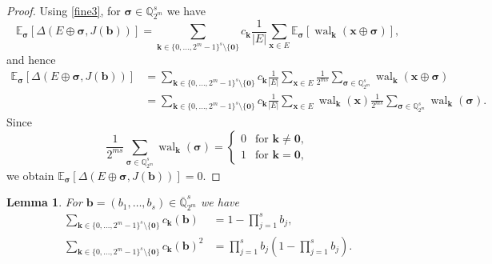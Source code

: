 \documentclass[12pt]{article}
\newtheorem{lemma}[theorem]{Lemma}
\theoremstyle{definition}
\numberwithin{equation}{section}
\begin{document}
\begin{proof}
Using \eqref{fine3}, for $\bm{\sigma} \in \mathbb{Q}_{2^m}^s$ we have
\begin{equation}\label{fo:Delta1}
\mathbb{E}_{\bm{\sigma}} [\Delta(E \oplus \bm{\sigma}, J(\bm{b})) ] = \sum_{\bm{k} \in \{0, \ldots, 2^{m}-1\}^s \setminus \{\bm{0}\}}  c_{\bm{k}} \frac{1}{|E|} \sum_{\bm{x} \in E} \mathbb{E}_{\bm{\sigma}} [ \operatorname{wal}_{\bm{k}}(\bm{x} \oplus \bm{\sigma}) ],
\end{equation}
and hence 
\begin{align*}
\mathbb{E}_{\bm{\sigma}} [\Delta(E \oplus \bm{\sigma}, J(\bm{b})) ] & = \sum_{\bm{k} \in \{0, \ldots, 2^m-1\}^s \setminus \{\bm{0}\}} c_{\bm{k}} \frac{1}{|E|} \sum_{\bm{x} \in E} \frac{1}{2^{ ms}} \sum_{\bm{\sigma} \in \mathbb{Q}_{2^m}^s} \operatorname{wal}_{\bm{k}}(\bm{x} \oplus \bm{\sigma}) \\ & = \sum_{\bm{k} \in \{0, \ldots, 2^m-1\}^s \setminus \{\bm{0}\}} c_{\bm{k}} \frac{1}{|E|} \sum_{\bm{x} \in E} \operatorname{wal}_{\bm{k}}(\bm{x}) \frac{1}{2^{ ms}} \sum_{\bm{\sigma} \in \mathbb{Q}_{2^m}^s} \operatorname{wal}_{\bm{k}}(\bm{\sigma}).
\end{align*}
Since
\begin{equation*}
\frac{1}{2^{ms}} \sum_{\bm{\sigma} \in \mathbb{Q}_{2^m}^s} \operatorname{wal}_{\bm{k}}(\bm{\sigma}) = \begin{cases} 0 & \mbox{for } \bm{k} \neq \bm{0}, \\ 1 & \mbox{for } \bm{k} = \bm{0}, \end{cases}
\end{equation*}
we obtain $\mathbb{E}_{\bm{\sigma}} [\Delta(E \oplus \bm{\sigma},J(\bm{b})) ] = 0$.
\end{proof}





\begin{lemma}\label{lem_aux}
For $\bm{b}=(b_1,\ldots,b_s) \in \overline{\mathbb{Q}}_{2^m}^s$ we have
\begin{align*}
\sum_{\bm{k} \in \{0, \ldots, 2^m-1\}^s \setminus\{\bm{0}\}} c_{\bm{k}}(\bm{b}) & = 1 - \prod_{j=1}^s b_j, \\
\sum_{\bm{k} \in \{0, \ldots, 2^m-1\}^s \setminus\{\bm{0}\}} c_{\bm{k}}(\bm{b})^2 & = \prod_{j=1}^s b_j \left( 1 - \prod_{j=1}^s b_j \right).
\end{align*}
\end{lemma}
\end{document}
